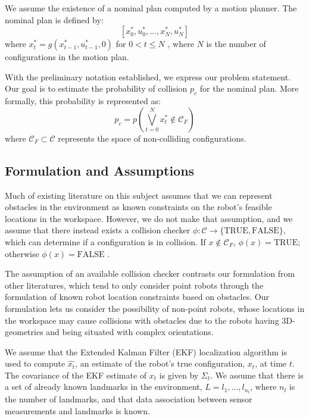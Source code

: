 \documentclass[journal]{IEEEtran}
\begin{document}
We assume the existence of a nominal plan computed by a motion planner. The nominal plan is defined by:
$$[x_0^*,u_0^*,...,x_N^*,u_N^*]$$
where $x_t^* = g(x_{t-1}^*,u_{t-1}^*,0)$ for $0 < t \leq N$ , where $N$ is the number of configurations in the motion plan.

With the preliminary notation established, we express our problem statement. Our goal is to estimate the probability of collision $p_c$ for the nominal plan. More formally, this probability is represented as:
$$p_c = p\left(\bigvee\limits_{t=0}^N x_t^* \notin \mathcal{C}_F \right)$$
where $\mathcal{C}_F \subset \mathcal{C}$ represents the space of non-colliding configurations.

\subsection{Formulation and Assumptions}

Much of existing literature on this subject assumes that we can represent obstacles in the environment as known constraints on the robot's feasible locations in the workspace. However, we do not make that assumption, and we assume that there instead exists a collision checker $\phi: \mathcal{C} \rightarrow \{\text{TRUE},\text{FALSE}\}$, which can determine if a configuration is in collision. If $x\notin \mathcal{C}_F$, $\phi(x) = \text{TRUE}$; otherwise $\phi(x) = \text{FALSE}$ \cite{IEEEhowto:lavalle}.

The assumption of an available collision checker contrasts our formulation from other literatures, which tend to only consider point robots through the formulation of known robot location constraints based on obstacles. Our formulation lets us consider the possibility of non-point robots, whose locations in the workspace may cause collisions with obstacles due to the robots having 3D-geometries and being situated with complex orientations.

We assume that the Extended Kalman Filter (EKF) localization algorithm \cite{IEEEhowto:thrun} is used to compute $\hat{x_t}$, an estimate of the robot's true configuration, $x_t$, at time $t$. The covariance of the EKF estimate of $x_t$ is given by $\Sigma_t$. We assume that there is a set  of already known landmarks in the environment, $L = {l_1,...,l_{n_l}}$, where $n_l$ is the number of landmarks, and that data association between sensor measurements and landmarks is known.
\end{document}
